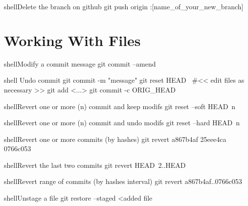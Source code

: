 \documentclass[10pt,a4paper]{article}
\begin{document}
\begin{multicols}{3}
\begin{codebox}{shell}{Delete the branch on github}
git push origin :[name_of_your_new_branch]

\end{codebox}

{\centering\section{Working With Files}}

\begin{codebox}{shell}{Modify a commit message}
git commit --amend

\end{codebox}

\begin{codebox}{shell}{}
Undo commit
git commit -m "message"
git reset HEAD~
#<< edit files as necessary >>
git add <...>
git commit -c ORIG_HEAD

\end{codebox}

\begin{codebox}{shell}{Revert one or more (n) commit and keep modifs}
git reset --soft HEAD~n

\end{codebox}

\begin{codebox}{shell}{Revert one or more (n) commit and undo modifs}
git reset --hard HEAD~n

\end{codebox}

\begin{codebox}{shell}{Revert one or more commits (by hashes)}
git revert a867b4af 25eee4ca 0766c053

\end{codebox}

\begin{codebox}{shell}{Revert the last two commits}
git revert HEAD~2..HEAD

\end{codebox}

\begin{codebox}{shell}{Revert range of commits (by hashes interval)}
git revert a867b4af..0766c053

\end{codebox}

\begin{codebox}{shell}{Unstage a file}
git restore --staged <added file

\end{codebox}


\end{multicols}
\end{document}
